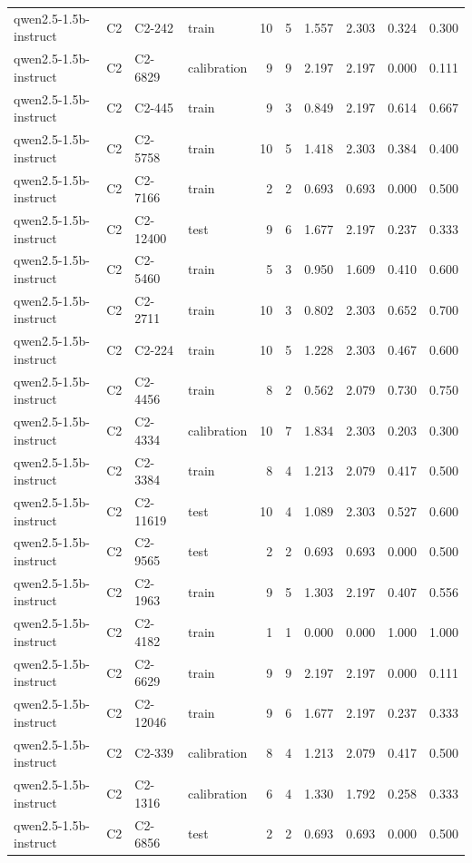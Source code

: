 \begin{table}
\begin{tabular}{llllrrrrrr}
qwen2.5-1.5b-instruct & C2 & C2-242 & train & 10 & 5 & 1.557 & 2.303 & 0.324 & 0.300 \\
qwen2.5-1.5b-instruct & C2 & C2-6829 & calibration & 9 & 9 & 2.197 & 2.197 & 0.000 & 0.111 \\
qwen2.5-1.5b-instruct & C2 & C2-445 & train & 9 & 3 & 0.849 & 2.197 & 0.614 & 0.667 \\
qwen2.5-1.5b-instruct & C2 & C2-5758 & train & 10 & 5 & 1.418 & 2.303 & 0.384 & 0.400 \\
qwen2.5-1.5b-instruct & C2 & C2-7166 & train & 2 & 2 & 0.693 & 0.693 & 0.000 & 0.500 \\
qwen2.5-1.5b-instruct & C2 & C2-12400 & test & 9 & 6 & 1.677 & 2.197 & 0.237 & 0.333 \\
qwen2.5-1.5b-instruct & C2 & C2-5460 & train & 5 & 3 & 0.950 & 1.609 & 0.410 & 0.600 \\
qwen2.5-1.5b-instruct & C2 & C2-2711 & train & 10 & 3 & 0.802 & 2.303 & 0.652 & 0.700 \\
qwen2.5-1.5b-instruct & C2 & C2-224 & train & 10 & 5 & 1.228 & 2.303 & 0.467 & 0.600 \\
qwen2.5-1.5b-instruct & C2 & C2-4456 & train & 8 & 2 & 0.562 & 2.079 & 0.730 & 0.750 \\
qwen2.5-1.5b-instruct & C2 & C2-4334 & calibration & 10 & 7 & 1.834 & 2.303 & 0.203 & 0.300 \\
qwen2.5-1.5b-instruct & C2 & C2-3384 & train & 8 & 4 & 1.213 & 2.079 & 0.417 & 0.500 \\
qwen2.5-1.5b-instruct & C2 & C2-11619 & test & 10 & 4 & 1.089 & 2.303 & 0.527 & 0.600 \\
qwen2.5-1.5b-instruct & C2 & C2-9565 & test & 2 & 2 & 0.693 & 0.693 & 0.000 & 0.500 \\
qwen2.5-1.5b-instruct & C2 & C2-1963 & train & 9 & 5 & 1.303 & 2.197 & 0.407 & 0.556 \\
qwen2.5-1.5b-instruct & C2 & C2-4182 & train & 1 & 1 & 0.000 & 0.000 & 1.000 & 1.000 \\
qwen2.5-1.5b-instruct & C2 & C2-6629 & train & 9 & 9 & 2.197 & 2.197 & 0.000 & 0.111 \\
qwen2.5-1.5b-instruct & C2 & C2-12046 & train & 9 & 6 & 1.677 & 2.197 & 0.237 & 0.333 \\
qwen2.5-1.5b-instruct & C2 & C2-339 & calibration & 8 & 4 & 1.213 & 2.079 & 0.417 & 0.500 \\
qwen2.5-1.5b-instruct & C2 & C2-1316 & calibration & 6 & 4 & 1.330 & 1.792 & 0.258 & 0.333 \\
qwen2.5-1.5b-instruct & C2 & C2-6856 & test & 2 & 2 & 0.693 & 0.693 & 0.000 & 0.500 \\

\end{tabular}
\end{table}
